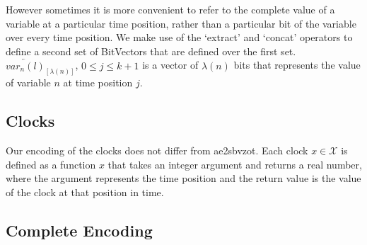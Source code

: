 \documentclass[a4paper,11pt]{report}
\theoremstyle{definition}
\newcommand{\aez}{ae2sbvzot}
\begin{document}
However sometimes it is more convenient to refer to the complete value of a
variable at a particular time position, rather than a particular bit of the
variable over every time position. We make use of the `extract' and
`concat' operators to define a second set of BitVectors that are defined over
the first set. \(\overleftarrow{var_{n}(l)}_{[\lambda(n)]}\), \(0 \leq j \leq
k+1\) is a vector of \(\lambda(n)\) bits that represents the value of variable
\(n\) at time position \(j\).


\subsection{Clocks}\label{encoding-clocks}

Our encoding of the clocks does not differ from \aez. Each clock
\(x \in \mathcal{X}\) is defined as a function \(x\) that takes an integer
argument and returns a real number, where the argument represents the time
position and the return value is the value of the clock at that position in
time.

\subsection{Complete Encoding}\label{complete-encoding}
\end{document}
